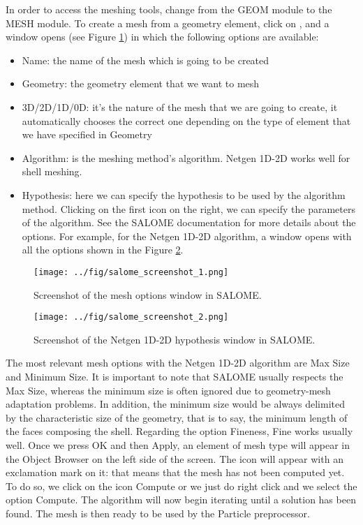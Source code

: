 \documentclass{../GPUSPHtemplate}
\begin{document}
In order to access the meshing tools, change from the GEOM 
module to the MESH module.
To create a mesh from a geometry element, click on , 
and a window opens (see Figure \ref{fig:salome_screenshot_1}) in which the following options are available:
\begin{itemize}
\item Name: the name of the mesh which is going to be created
\item Geometry: the geometry element that we want to mesh
\item 3D/2D/1D/0D: it’s the nature of the mesh that we are 
going to create, it automatically chooses the correct one 
depending on the type of element that we have specified in Geometry
\item Algorithm: is the meshing method’s algorithm. 
Netgen 1D-2D works well for shell meshing.
\item Hypothesis: here we can specify the hypothesis to be used 
by the algorithm method. Clicking on the first icon on the right, 
we can specify the parameters of the algorithm. See the SALOME 
documentation for more details about the options. 
For example, for the Netgen 1D-2D algorithm, a window opens 
with all the options shown in the Figure \ref{fig:salome_screenshot_2}.
\end{itemize}

\begin{figure}[h]
  \begin{center}
    \texttt{[image: ../fig/salome\_screenshot\_1.png]}
    \caption{Screenshot of the mesh options window in SALOME.}\label{fig:salome_screenshot_1}   
  \end{center}
\end{figure}

\begin{figure}[h]
  \begin{center}
    \texttt{[image: ../fig/salome\_screenshot\_2.png]}
    \caption{Screenshot of the Netgen 1D-2D hypothesis window in SALOME.}\label{fig:salome_screenshot_2}   
  \end{center}
\end{figure}

The most relevant mesh options with the Netgen 1D-2D algorithm 
are Max Size and Minimum Size. 
It is important to note that SALOME usually respects the Max Size, 
whereas the minimum size is often ignored due to geometry-mesh 
adaptation problems. In addition, the minimum size would be 
always delimited by the characteristic size of the geometry, 
that is to say, the minimum length of the faces composing the shell. 
Regarding the option Fineness, Fine works usually well. 
Once we press OK and then Apply, an element of mesh type 
will appear in the Object Browser on the left side of the screen. 
The icon will appear with an exclamation mark on it: that means 
that the mesh has not been computed yet. To do so, we click on 
the icon Compute or we just do right click and we select 
the option Compute. The algorithm will now begin iterating 
until a solution has been found. 
The mesh is then ready to be used by the Particle preprocessor.
\end{document}
